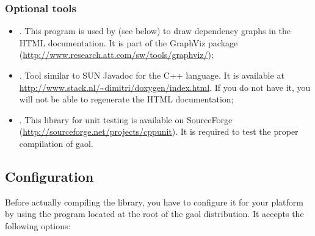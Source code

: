 \documentclass{manual}
\begin{document}
\subsubsection{Optional tools}

\begin{itemize}
\item {}. This program is used by 
%
(see below) to draw dependency graphs in the HTML documentation. It is
part of the GraphViz package (\url{http://www.research.att.com/sw/tools/graphviz/});
%
\item {}. Tool similar to SUN Javadoc for the C++ language. It is
available at \url{http://www.stack.nl/~dimitri/doxygen/index.html}.
If you do not have it, you will not be able to regenerate the HTML documentation;
%
\item {}. This library for unit testing is available on SourceForge
  (\url{http://sourceforge.net/projects/cppunit}). It is required to test the
  proper compilation of gaol.
%
\end{itemize}

\subsection{Configuration}\label{sec:configuration}

Before actually compiling the library, you have to configure it for your
platform by using the  program
located at the root of the gaol distribution. It accepts the following options:
%
\end{document}
